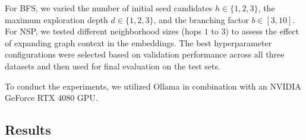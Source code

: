 \documentclass[11pt]{article}
\begin{document}
For BFS, we varied the number of initial seed candidates $h \in \{1,2,3\}$, the maximum exploration depth $d \in \{1,2,3\}$, and the branching factor $b \in [3,10]$. For NSP, we tested different neighborhood sizes (hops $1$ to $3$) to assess the effect of expanding graph context in the embeddings.
The best hyperparameter configurations were selected based on validation performance across all three datasets and then used for final evaluation on the test sets.

To conduct the experiments, we utilized Ollama in combination with an NVIDIA GeForce RTX 4080 GPU.






















\subsection{Results}
\end{document}
